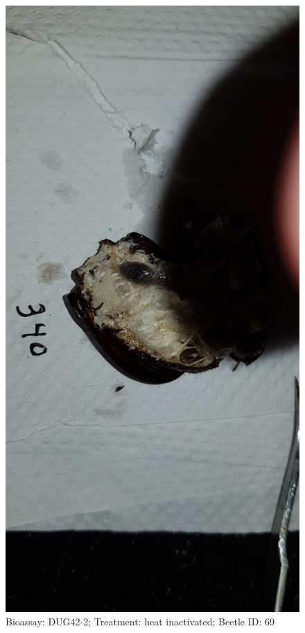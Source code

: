 \documentclass[11pt]{scrartcl}
\begin{document}
\begin{figure}[h!]
    \centering
    \includegraphics[width=\linewidth, height=\textheight, keepaspectratio]{uploads/btl.pm_image.b9ceff1fc826f7c3.4475673432203334305f5265702d3220284849292e6a7067.jpg}
    \caption{Bioassay: DUG42-2; Treatment: heat inactivated; Beetle ID: 69}
\end{figure}
\clearpage
\end{document}
